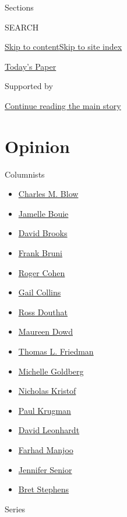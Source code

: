 Sections

SEARCH

\protect\hyperlink{site-content}{Skip to
content}\protect\hyperlink{site-index}{Skip to site index}

\href{https://myaccount.nytimes.com/auth/login?response_type=cookie\&client_id=vi}{}

\href{https://www.nytimes.com/section/todayspaper}{Today's Paper}

Supported by

\protect\hyperlink{after-sponsor}{Continue reading the main story}

\hypertarget{opinion}{%
\section{Opinion}\label{opinion}}

Columnists

\begin{itemize}
\tightlist
\item
  \href{/column/charles-m-blow}{Charles M. Blow}
\item
  \href{/column/jamelle-bouie}{Jamelle Bouie}
\item
  \href{/column/david-brooks}{David Brooks}
\item
  \href{/column/frank-bruni}{Frank Bruni}
\item
  \href{/column/roger-cohen}{Roger Cohen}
\item
  \href{/column/gail-collins}{Gail Collins}
\item
  \href{/column/ross-douthat}{Ross Douthat}
\item
  \href{/column/maureen-dowd}{Maureen Dowd}
\item
  \href{/column/thomas-l-friedman}{Thomas L. Friedman}
\item
  \href{/column/michelle-goldberg}{Michelle Goldberg}
\item
  \href{/column/nicholas-kristof}{Nicholas Kristof}
\item
  \href{/column/paul-krugman}{Paul Krugman}
\item
  \href{/column/david-leonhardt}{David Leonhardt}
\item
  \href{/column/farhad-manjoo}{Farhad Manjoo}
\item
  \href{/column/jennifer-senior}{Jennifer Senior}
\item
  \href{/column/bret-stephens}{Bret Stephens}
\end{itemize}

Series

